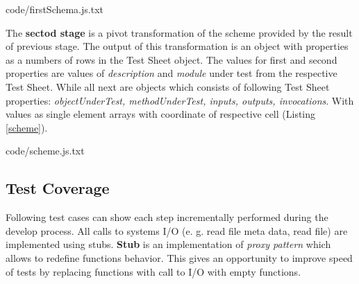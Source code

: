 
{code/firstSchema.js.txt}

The \textbf{sectod stage} is a pivot transformation of the scheme provided by the result of previous stage. The output of this transformation is an object with properties as a numbers of rows in the Test Sheet object. The values for first and second properties are values of \textit{description} and \textit{module} under test from the respective Test Sheet. While all next are objects which consists of following Test Sheet properties: \textit{objectUnderTest, methodUnderTest, inputs, outputs, invocations}. With values as single element arrays with coordinate of respective cell (Listing \ref{scheme}).

{code/scheme.js.txt}

%
\subsection{Test Coverage}
Following test cases can show each step incrementally performed during the develop process. All calls to systems I/O (e. g. read file meta data, read file) are implemented using stubs. \textbf{Stub} is an implementation of \textit{proxy pattern} which allows to redefine functions behavior. This gives an opportunity to improve speed of tests by replacing functions with call to I/O with empty functions.
%

